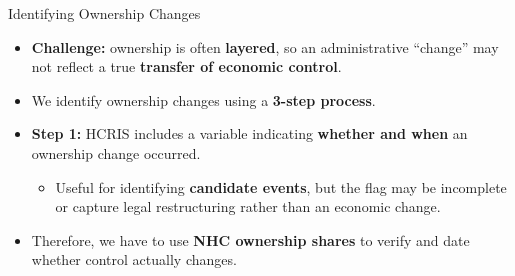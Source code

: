 \documentclass{beamer}
\begin{document}
\begin{frame}[t]{Identifying Ownership Changes}

\small
\begin{itemize}
	\setlength{\itemsep}{0.75em}
	\item \textbf{Challenge:} ownership is often \textbf{layered}, so an administrative “change” may not reflect a true \textbf{transfer of economic control}.
	\vspace{0.35em}

	\item We identify ownership changes using a \textbf{3-step process}.
	\vspace{0.15em}
	
	\pause

	\item \textbf{Step 1:} HCRIS includes a variable indicating \textbf{whether and when} an 								ownership change occurred.
	
	\begin{itemize}
	\setlength{\itemsep}{0.2em}
		\item Useful for identifying \textbf{candidate events}, but the flag may be incomplete or capture legal 				restructuring rather than an economic change.
	\end{itemize}
	\vspace{0.20em}

	\item Therefore, we have to use \textbf{NHC ownership shares} to verify and date whether control						actually changes.
	
\end{itemize}
\end{frame}
\end{document}
